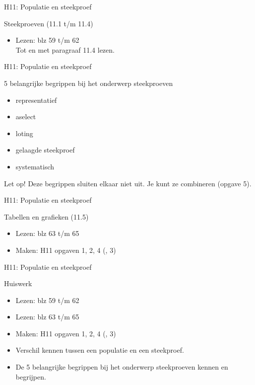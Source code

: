 \begin{frame}{H11: Populatie en steekproef}
 \begin{block}{Steekproeven (11.1 t/m 11.4)}
  \begin{itemize}
   \item Lezen: blz 59 t/m 62
        \\ Tot en met paragraaf 11.4 lezen.
  \end{itemize}
 \end{block}
\end{frame}

\begin{frame}{H11: Populatie en steekproef}
 \begin{block}{5 belangrijke begrippen bij het onderwerp steekproeven}
  \begin{itemize}
   \item representatief
    \item aselect
    \item loting
    \item gelaagde steekproef
    \item systematisch
  \end{itemize}
 \end{block}
 
 Let op! Deze begrippen sluiten elkaar niet uit. 
 Je kunt ze combineren (opgave 5).
\end{frame}

\begin{frame}{H11: Populatie en steekproef}
 \begin{block}{Tabellen en grafieken (11.5)}
  \begin{itemize}
   \item Lezen: blz 63 t/m 65
   \item Maken: H11 opgaven 1, 2, 4 (, 3)
  \end{itemize}
 \end{block}
\end{frame}

\begin{frame}{H11: Populatie en steekproef}
 \begin{block}{Huiswerk}
  \begin{itemize}
   \item Lezen: blz 59 t/m 62
   \item Lezen: blz 63 t/m 65
   \item Maken: H11 opgaven 1, 2, 4 (, 3)
   \item Verschil kennen tussen een populatie en een steekproef.
   \item De 5 belangrijke begrippen bij het onderwerp steekproeven kennen en begrijpen.
  \end{itemize}
 \end{block}
\end{frame}
